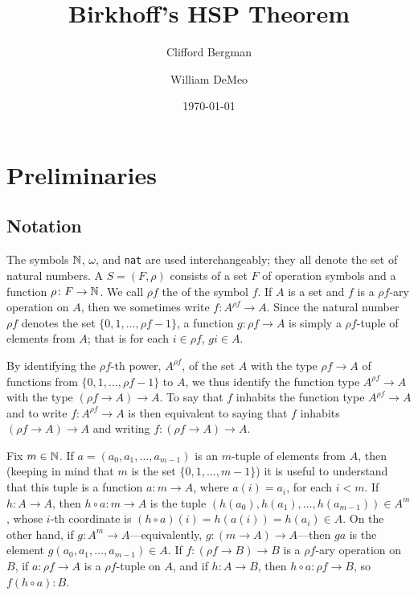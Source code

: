 \title{Birkhoff's HSP Theorem}
\author[C.~Bergman]{Clifford Bergman}
\author[W.~DeMeo]{William DeMeo}
\date{\today}



\maketitle

\section{Preliminaries}
\subsection{Notation}
The symbols $\mathbb{N}$, $\omega$, and {\tt nat} are used interchangeably; they all denote the 
set of natural numbers. A  $S = (F, \rho)$ consists of a set $F$ of 
operation symbols and a function $\rho \colon F \to \mathbb{N}$.  We call $\rho f$ the 
 of the symbol $f$.  If $A$ is a set and $f$ is a $\rho f$-ary 
operation on $A$, then we sometimes write $f \colon A^{\rho f} \to A$.  
Since the natural number $\rho f$ 
denotes the set $\{0, 1, \dots, \rho f -1\}$, a function $g \colon \rho f \to A$
is simply a $\rho f$-tuple of elements from $A$; that is for each 
$i\in \rho f$, $g i \in A$.

By identifying the $\rho f$-th power, $A^{\rho f}$, of the set $A$ with 
the type $\rho f \to A$ of functions from $\{0, 1, \dots, \rho f -1\}$ to $A$, 
we thus identify the function type $A^{\rho f} \to A$ with the type 
$(\rho f \to A) \to A$. 
To say that $f$ inhabits the function type $A^{\rho f} \to A$ and to write 
$f \colon A^{\rho f} \to A$ is then equivalent to saying that $f$ inhabits
$(\rho f \to A) \to A$ and writing $f \colon (\rho f \to A) \to A$.

Fix $m\in \mathbb{N}$. If $a = (a_0, a_1, \dots, a_{m-1})$ is an $m$-tuple of elements from $A$, 
then (keeping in mind that $m$ is the set $\{0, 1, \dots, m-1\}$) it is 
useful to understand that this tuple is a function $a : m \to A$, 
where $a(i) = a_i$, for each $i<m$.
If $h \colon A \to A$, then $h\circ a : m \to A$ is the tuple 
$(h(a_0), h(a_1), \dots, h(a_{m-1}))\in A^m$, whose $i$-th coordinate is
$(h\circ a)(i) = h(a(i)) = h(a_i) \in A$.
On the other hand, if $g \colon A^m \to A$---equivalently, 
$g \colon (m \to A) \to A$---then $g a$ is the element $g(a_0, a_1, \dots, a_{m-1}) \in A$.
If $f \colon (\rho f \to B) \to B$ is a $\rho f$-ary operation on $B$,  
if $a \colon \rho f \to A$ is a $\rho f$-tuple on $A$, and if 
$h \colon A \to B$, then $h \circ a \colon \rho f \to B$, so 
$f (h \circ a) \colon B$.

